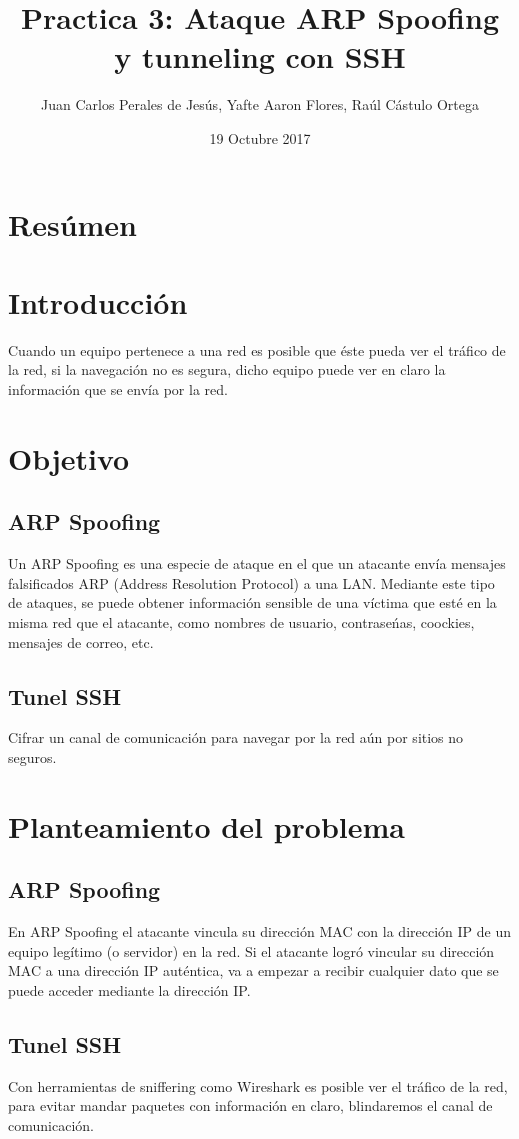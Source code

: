 \documentclass{article}
\title{Practica 3: Ataque ARP Spoofing y tunneling con SSH}
\author{Juan Carlos Perales de Jes\'us, Yafte Aaron Flores, Ra\'ul C\'astulo Ortega}
\date{19 Octubre 2017}
\begin{document}
\maketitle
\newpage

\section{Res\'umen}

\section{Introducci\'on}
Cuando un equipo pertenece a una red es posible que \'este pueda ver el tr\'afico de la red, si la navegaci\'on no es segura, dicho equipo puede ver en claro la informaci\'on que se env\'ia por la red.
 
\section{Objetivo}
\subsection{ARP Spoofing}
Un ARP Spoofing es una especie de ataque en el que un atacante env\'ia mensajes falsificados ARP (Address Resolution Protocol) a una LAN.
Mediante este tipo de ataques, se puede obtener informaci\'on sensible de una v\'ictima que est\'e en la misma red que el atacante, como nombres de usuario, contrase\'nas, coockies, mensajes de correo, etc.
\subsection{Tunel SSH}
Cifrar un canal de comunicaci\'on para navegar por la red a\'un por sitios no seguros.

\section{Planteamiento del problema}
\subsection{ARP Spoofing}
En ARP Spoofing el atacante vincula su direcci\'on MAC con la direcci\'on IP de un equipo leg\'itimo (o servidor) en la red.
Si el atacante logró vincular su dirección MAC a una dirección IP auténtica, va a empezar a recibir cualquier dato que se puede acceder mediante la dirección IP.
\subsection{Tunel SSH}
Con herramientas de sniffering como Wireshark es posible ver el tr\'afico de la red, para evitar mandar paquetes con informaci\'on en claro, blindaremos el canal de comunicaci\'on.
\end{document}
